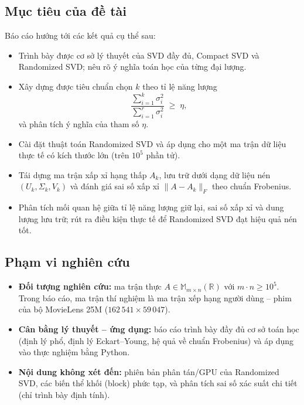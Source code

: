 \subsection{Mục tiêu của đề tài}

Báo cáo hướng tới các kết quả cụ thể sau:
\begin{itemize}
    \item Trình bày được cơ sở lý thuyết của SVD đầy đủ, Compact SVD và
          Randomized SVD; nêu rõ ý nghĩa toán học của từng đại lượng.
    \item Xây dựng được tiêu chuẩn chọn $k$ theo tỉ lệ năng lượng
          $$ \frac{\sum_{i=1}^{k}\sigma_i^2}{\sum_{i=1}^{r}\sigma_i^2} \;\ge\; \eta,$$
          và phân tích ý nghĩa của tham số $\eta$.
    \item Cài đặt thuật toán Randomized SVD và áp dụng cho một ma trận dữ liệu
          thực tế có kích thước lớn (trên $10^5$ phần tử).
    \item Tái dựng ma trận xấp xỉ hạng thấp $A_k$, lưu trữ dưới dạng dữ liệu nén
          $(U_k, \Sigma_k, V_k)$ và đánh giá sai số xấp xỉ
          $\|A - A_k\|_F$ theo chuẩn Frobenius.
    \item Phân tích mối quan hệ giữa tỉ lệ năng lượng giữ lại, sai số xấp xỉ và
          dung lượng lưu trữ; rút ra điều kiện thực tế để Randomized SVD đạt
          hiệu quả nén tốt.
\end{itemize}

\subsection{Phạm vi nghiên cứu}

\begin{itemize}
    \item \textbf{Đối tượng nghiên cứu:} ma trận thực $A \in \mathbb{M}_{m\times n}(\mathbb{R})$
          với $m\cdot n \ge 10^5$. Trong báo cáo, ma trận thí nghiệm là ma trận
          xếp hạng người dùng -- phim của bộ MovieLens 25M
          ($162\,541 \times 59\,047$).
    \item \textbf{Cân bằng lý thuyết -- ứng dụng:} báo cáo trình bày đầy đủ cơ
          sở toán học (định lý phổ, định lý Eckart--Young, hệ quả về chuẩn
          Frobenius) và áp dụng vào thực nghiệm bằng Python.
    \item \textbf{Nội dung không xét đến:} phiên bản phân tán/GPU của
          Randomized SVD, các biến thể khối (block) phức tạp, và phân tích sai
          số xác suất chi tiết (chỉ trình bày định tính).
\end{itemize}


